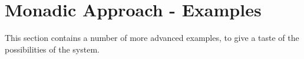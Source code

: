
\section{Monadic Approach - Examples}

\label{monadic_examples}

    This section contains a number of more advanced examples, to give
    a taste of the possibilities of the system. 







      
